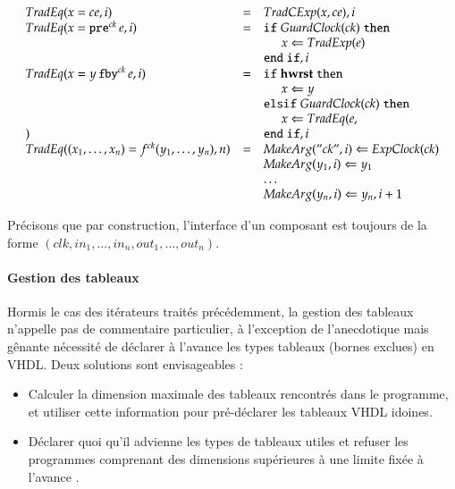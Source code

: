 \documentclass[9pt,a4paper]{article}
\newcommand{\mybox}[1]{\mbox{\tt{#1}}}
\newcommand{\ind}[0]{\hspace{0.5cm}}
\newcommand{\Fby}[2]{#1 \, \mybox{fby}^{ck} \, #2}
\newcommand{\Pre}[1]{\mybox{pre}^{ck} \, #1}
\newcommand{\App}[2]{#1^{ck}(#2)}
\newcommand{\Assign}[2]{#1 \Leftarrow #2}
\begin{document}
\[
\begin{array}{lcl}
  \TradEq{x = ce}{i} & = & \TradCE{x}{ce}, i \\

  \TradEq{x = \Pre{e}}{i} & = & \mathtt{if} \; \GEC{ck} \; \mathtt{then} \\
  & & \ind \Assign{x}{\TradE{e}} \\
  & & \mathtt{end} \; \mathtt{if}, i \\

  \TradEq{x = \Fby{y}{e}}{i} & = & \mathtt{if} \; \mathbf{hwrst}
  \; \mathtt{then} \\
  & & \ind \Assign{x}{y} \\
  & & \mathtt{elsif} \; \GEC{ck} \; \mathtt{then} \\
  & & \ind \Assign{x}{\TradEq{e}} \\
  & & \mathtt{end} \; \mathtt{if}, i \\


  \TradEq{(x_1,\dots,x_n) = \App{f}{y_1,\dots,y_n}}{n} & = &
  \Assign{\MA{"ck"}{i}}{\EC{ck}} \\
  & & \Assign{\MA{y_1}{i}}{y_1} \\
  & & \dots \\
  & & \Assign{\MA{y_n}{i}}{y_n}, i + 1 \\
\end{array}
\]

Précisons que par construction, l'interface d'un composant est toujours de la
forme $(clk, in_1, \dots,in_n, out_1,\dots,out_n)$.

\paragraph{Gestion des tableaux}

Hormis le cas des itérateurs traités précédemment, la gestion des tableaux
n'appelle pas de commentaire particulier, à l'exception de l'anecdotique mais
gênante nécessité de déclarer à l'avance les types tableaux (bornes exclues) en
VHDL. Deux solutions sont envisageables :

\begin{itemize}
\item Calculer la dimension maximale des tableaux rencontrés dans le programme,
  et utiliser cette information pour pré-déclarer les tableaux VHDL idoines.
\item Déclarer quoi qu'il advienne les types de tableaux utiles et refuser les
  programmes comprenant des dimensions supérieures à une limite fixée à l'avance
  .
\end{itemize}
\end{document}
